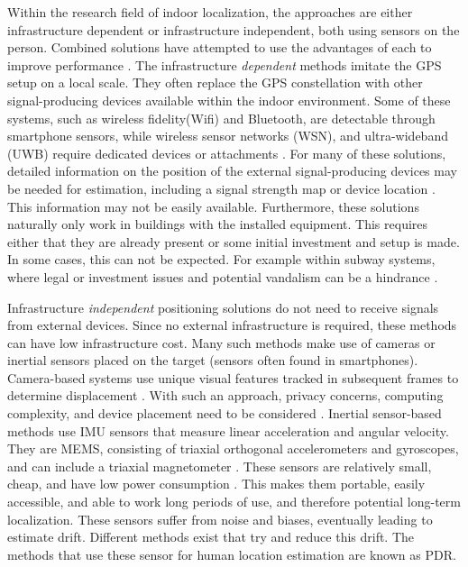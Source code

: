 Within the research field of indoor localization, the approaches are either infrastructure dependent or infrastructure independent, both using sensors on the person. Combined solutions have attempted to use the advantages of each to improve performance \cite{Gu2019, Correa2017}. The infrastructure \textit{dependent} methods imitate the GPS setup on a local scale. They often replace the GPS constellation with other signal-producing devices available within the indoor environment. Some of these systems, such as wireless fidelity(Wifi) and Bluetooth, are detectable through smartphone sensors, while wireless sensor networks (WSN), and ultra-wideband (UWB) require dedicated devices or attachments \cite{Wu2019,Jackermeier2018,Davidson2017}. For many of these solutions, detailed information on the position of the external signal-producing devices may be needed for estimation, including a signal strength map or device location \cite{Jackermeier2018,Shang2015}. This information may not be easily available. Furthermore, these solutions naturally only work in buildings with the installed equipment. This requires either that they are already present or some initial investment and setup is made. In some cases, this can not be expected. For example within subway systems, where legal or investment issues and potential vandalism can be a hindrance \cite{Torok2014}. \par
%

Infrastructure \textit{independent} positioning solutions do not need to receive signals from external devices. Since no external infrastructure is required, these methods can have low infrastructure cost. Many such methods make use of cameras or inertial sensors placed on the target (sensors often found in smartphones). Camera-based systems use unique visual features tracked in subsequent frames to determine displacement \cite{Gu2019}. With such an approach, privacy concerns, computing complexity, and device placement need to be considered \cite{Gu2019}. Inertial sensor-based methods use \ac{IMU} sensors that measure linear acceleration and angular velocity. They are \ac{MEMS},  consisting of triaxial orthogonal accelerometers and gyroscopes, and can include a triaxial magnetometer \cite{Yang2014}. These sensors are relatively small, cheap, and have low power consumption \cite{Olsson2016}. This makes them portable, easily accessible, and able to work long periods of use, and therefore potential long-term localization. These sensors suffer from noise and biases, eventually leading to estimate drift. Different methods exist that try and reduce this drift. The methods that use these sensor for human location estimation are known as \ac{PDR}. \par

